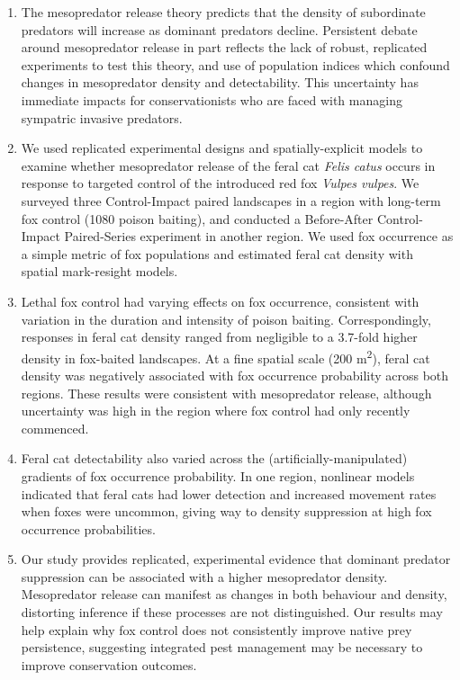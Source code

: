 \documentclass[preprint, 3p, authoryear]{elsarticle} %
\begin{document}
\begin{enumerate}
\def\labelenumi{\arabic{enumi}.}
\item
  The mesopredator release theory predicts that the density of subordinate predators will increase as dominant predators decline. Persistent debate around mesopredator release in part reflects the lack of robust, replicated experiments to test this theory, and use of population indices which confound changes in mesopredator density and detectability. This uncertainty has immediate impacts for conservationists who are faced with managing sympatric invasive predators.
\item
  We used replicated experimental designs and spatially-explicit models to examine whether mesopredator release of the feral cat \emph{Felis catus} occurs in response to targeted control of the introduced red fox \emph{Vulpes vulpes}. We surveyed three Control-Impact paired landscapes in a region with long-term fox control (1080 poison baiting), and conducted a Before-After Control-Impact Paired-Series experiment in another region. We used fox occurrence as a simple metric of fox populations and estimated feral cat density with spatial mark-resight models.
\item
  Lethal fox control had varying effects on fox occurrence, consistent with variation in the duration and intensity of poison baiting. Correspondingly, responses in feral cat density ranged from negligible to a 3.7-fold higher density in fox-baited landscapes. At a fine spatial scale (200 m\textsuperscript{2}), feral cat density was negatively associated with fox occurrence probability across both regions. These results were consistent with mesopredator release, although uncertainty was high in the region where fox control had only recently commenced.
\item
  Feral cat detectability also varied across the (artificially-manipulated) gradients of fox occurrence probability. In one region, nonlinear models indicated that feral cats had lower detection and increased movement rates when foxes were uncommon, giving way to density suppression at high fox occurrence probabilities.
\item
  Our study provides replicated, experimental evidence that dominant predator suppression can be associated with a higher mesopredator density. Mesopredator release can manifest as changes in both behaviour and density, distorting inference if these processes are not distinguished. Our results may help explain why fox control does not consistently improve native prey persistence, suggesting integrated pest management may be necessary to improve conservation outcomes.
\end{enumerate}
\end{document}
